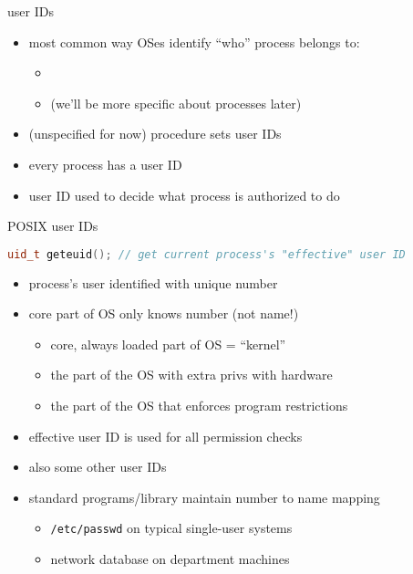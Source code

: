 \begin{frame}{user IDs}
    \begin{itemize}
    \item most common way OSes identify ``who'' process belongs to:
	\begin{itemize}
	\item {}
	\item (we'll be more specific about processes later)
	\end{itemize}
    \vspace{.5cm}
    \item (unspecified for now) procedure sets user IDs
    \item every process has a user ID
    \item user ID used to decide what process is authorized to do
    \end{itemize}
\end{frame}

\begin{frame}[fragile,label=posixUID]{POSIX user IDs}
\begin{lstlisting}[language=C++,style=small]
uid_t geteuid(); // get current process's "effective" user ID
\end{lstlisting}
\begin{itemize}
\item process's user identified with unique number
\item core part of OS only knows number (not name!)
    \begin{itemize}
    \item core, always loaded part of OS = ``kernel''
    \item the part of the OS with extra privs with hardware
    \item the part of the OS that enforces program restrictions
    \end{itemize}
\item effective user ID is used for all permission checks
\item also some other user IDs
\vspace{.5cm}
\item<2-> standard programs/library maintain number to name mapping
    \begin{itemize}
    \item<2-> \texttt{/etc/passwd} on typical single-user systems
    \item<2-> network database on department machines
    \end{itemize}
\end{itemize}
\end{frame}
